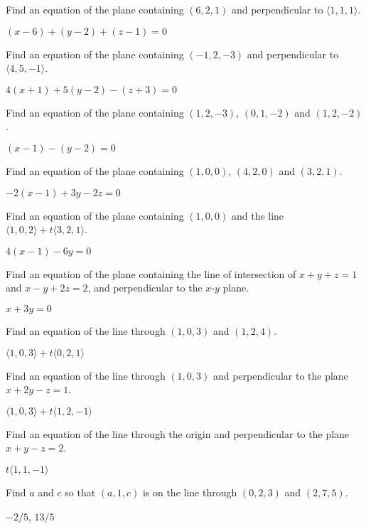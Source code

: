 \begin{exercises}

\exercise Find an equation of the plane containing $(6,2,1)$ and
perpendicular to $\langle 1,1,1\rangle$.
\begin{answer} $(x-6)+(y-2)+(z-1)=0$
\end{answer}

\exercise Find an equation of the plane containing $(-1,2,-3)$ and
perpendicular to $\langle 4,5,-1\rangle$.
\begin{answer} $4(x+1)+5(y-2)-(z+3)=0$
\end{answer}

\exercise Find an equation of the plane containing $(1,2,-3)$,
$(0,1,-2)$ and $(1,2,-2)$.
\begin{answer} $(x-1)-(y-2)=0$
\end{answer}

\exercise Find an equation of the plane containing $(1,0,0)$,
$(4,2,0)$ and $(3,2,1)$.
\begin{answer} $-2(x-1)+3y-2z=0$
\end{answer}

\exercise Find an equation of the plane containing $(1,0,0)$ and the
line $\langle 1,0,2\rangle + t\langle 3,2,1\rangle$.
\begin{answer} $4(x-1)-6y = 0$
\end{answer}

\exercise Find an equation of the plane containing the line of
intersection of $x+y+z=1$ and $x-y+2z=2$, and perpendicular to the
$x$-$y$ plane.
\begin{answer} $x+3y=0$
\end{answer}

\exercise Find an equation of the line through $(1,0,3)$ and 
$(1,2,4)$.
\begin{answer} $\langle 1,0,3\rangle+t\langle 0,2,1\rangle$
\end{answer}

\exercise Find an equation of the line through $(1,0,3)$ and 
perpendicular to the plane $x+2y-z=1$.
\begin{answer} $\langle 1,0,3\rangle+t\langle 1,2,-1\rangle$
\end{answer}

\exercise Find an equation of the line through the origin
and perpendicular to the plane $x+y-z=2$.
\begin{answer} $t\langle 1,1,-1\rangle$
\end{answer}

\exercise Find $a$ and $c$ so that $(a,1,c)$ is on the line through
$(0,2,3)$ and $(2,7,5)$.
\begin{answer} $-2/5$, $13/5$
\end{answer}


\end{exercises}
